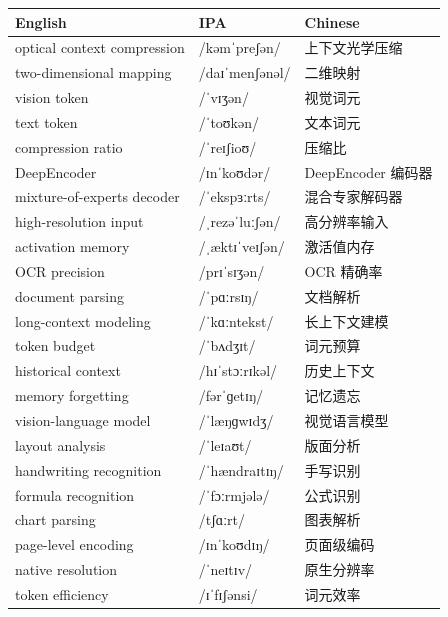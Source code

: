\documentclass[UTF8,12pt,a4paper]{ctexart}
\providecommand{\zh}[1]{#1}
\begin{document}
\begin{tabular*}{\textwidth}{@{\extracolsep{\fill}}lll@{}}
\toprule
\textbf{English} & \textbf{IPA} & \textbf{Chinese} \\
\midrule
optical context compression & {\ipafont /kəmˈpreʃən/} & \zh{上下文光学压缩} \\
two-dimensional mapping & {\ipafont /daɪˈmenʃənəl/} & \zh{二维映射} \\
vision token & {\ipafont /ˈvɪʒən/} & \zh{视觉词元} \\
text token & {\ipafont /ˈtoʊkən/} & \zh{文本词元} \\
compression ratio & {\ipafont /ˈreɪʃioʊ/} & \zh{压缩比} \\
DeepEncoder & {\ipafont /ɪnˈkoʊdər/} & \zh{DeepEncoder 编码器} \\
mixture-of-experts decoder & {\ipafont /ˈekspɜːrts/} & \zh{混合专家解码器} \\
high-resolution input & {\ipafont /ˌrezəˈluːʃən/} & \zh{高分辨率输入} \\
activation memory & {\ipafont /ˌæktɪˈveɪʃən/} & \zh{激活值内存} \\
OCR precision & {\ipafont /prɪˈsɪʒən/} & \zh{OCR 精确率} \\
document parsing & {\ipafont /ˈpɑːrsɪŋ/} & \zh{文档解析} \\
long-context modeling & {\ipafont /ˈkɑːntekst/} & \zh{长上下文建模} \\
token budget & {\ipafont /ˈbʌdʒɪt/} & \zh{词元预算} \\
historical context & {\ipafont /hɪˈstɔːrɪkəl/} & \zh{历史上下文} \\
memory forgetting & {\ipafont /fərˈɡetɪŋ/} & \zh{记忆遗忘} \\
vision-language model & {\ipafont /ˈlæŋɡwɪdʒ/} & \zh{视觉语言模型} \\
layout analysis & {\ipafont /ˈleɪaʊt/} & \zh{版面分析} \\
handwriting recognition & {\ipafont /ˈhændraɪtɪŋ/} & \zh{手写识别} \\
formula recognition & {\ipafont /ˈfɔːrmjələ/} & \zh{公式识别} \\
chart parsing & {\ipafont /tʃɑːrt/} & \zh{图表解析} \\
page-level encoding & {\ipafont /ɪnˈkoʊdɪŋ/} & \zh{页面级编码} \\
native resolution & {\ipafont /ˈneɪtɪv/} & \zh{原生分辨率} \\
token efficiency & {\ipafont /ɪˈfɪʃənsi/} & \zh{词元效率} \\

\end{tabular*}
\end{document}

